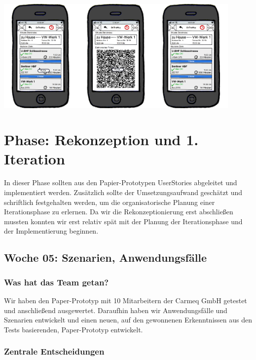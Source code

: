 \documentclass{article}
\begin{document}
\begin{center}
\includegraphics[width=12cm]{08_konvergenter_paperprototyp01_012.png}
\end{center}






\section{Phase: Rekonzeption und 1. Iteration}

In dieser Phase sollten aus den Papier-Prototypen UserStories abgeleitet und implementiert werden. Zus\"atzlich sollte der Umsetzungsaufwand gesch\"atzt und schriftlich festgehalten werden, um die organisatorische Planung einer Iterationsphase zu erlernen. Da wir die Rekonzeptionierung erst abschlie\ss en mussten konnten wir erst relativ sp\"at mit der Planung der Iterationsphase und der Implementierung beginnen.

\subsection{Woche 05: Szenarien, Anwendungsf\"alle}

\subsubsection{Was hat das Team getan?}

Wir haben den Paper-Prototyp mit 10 Mitarbeitern der Carmeq GmbH getestet und anschlie\ss end ausgewertet. Daraufhin haben wir Anwendungsf\"alle und Szenarien entwickelt und einen neuen, auf den gewonnenen Erkenntnissen aus den Tests basierenden, Paper-Prototyp entwickelt.

\subsubsection{Zentrale Entscheidungen}
\end{document}
